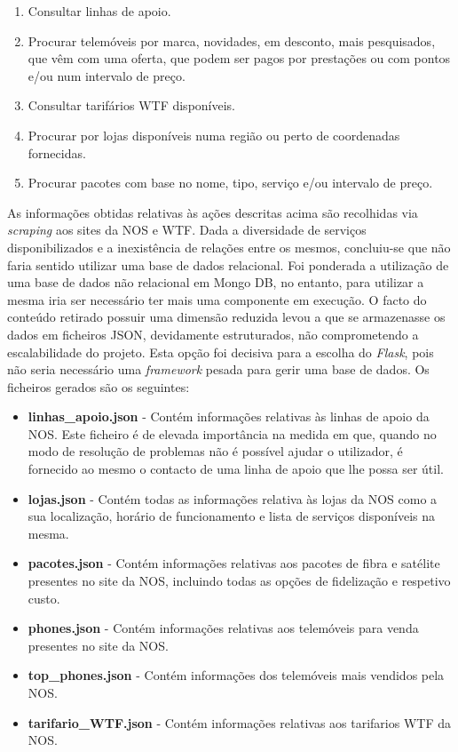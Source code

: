 \documentclass[11pt,a4paper]{article}
\begin{document}
\begin{enumerate}
    \item Consultar linhas de apoio.
    \item Procurar telemóveis por marca, novidades, em desconto, mais pesquisados, que vêm com uma oferta,
    que podem ser pagos por prestações ou com pontos e/ou num intervalo de preço.
    \item Consultar tarifários WTF disponíveis.
    \item Procurar por lojas disponíveis numa região ou perto de coordenadas fornecidas.
    \item Procurar pacotes com base no nome, tipo, serviço e/ou intervalo de preço.
\end{enumerate}

As informações obtidas relativas às ações descritas acima são recolhidas via \textit{scraping} aos sites da
NOS e WTF. Dada a diversidade de serviços disponibilizados e a inexistência de relações entre os mesmos,
concluiu-se que não faria sentido utilizar uma base de dados relacional. Foi ponderada a utilização de uma
base de dados não relacional em Mongo DB, no entanto, para utilizar a mesma iria ser necessário ter mais uma
componente em execução. O facto do conteúdo retirado possuir uma dimensão reduzida levou a que se
armazenasse os dados em ficheiros JSON, devidamente estruturados, não comprometendo a escalabilidade do
projeto. Esta opção foi decisiva para a escolha do \textit{Flask}, pois não seria necessário uma
\textit{framework} pesada para gerir uma base de dados. Os ficheiros gerados são os seguintes:

\begin{itemize}
    \item \textbf{linhas\_apoio.json} - Contém informações relativas às linhas de apoio da NOS. Este
      ficheiro é de elevada importância na medida em que, quando no modo de resolução de problemas não é possível
      ajudar o utilizador, é fornecido ao mesmo o contacto de uma linha de apoio que lhe possa ser útil.
    \item \textbf{lojas.json} - Contém todas as informações relativa às lojas da NOS como a sua localização, horário
      de funcionamento e lista de serviços disponíveis na mesma.
    \item \textbf{pacotes.json} - Contém informações relativas aos pacotes de fibra e satélite presentes no
      site da NOS, incluindo todas as opções de fidelização e respetivo custo.
    \item \textbf{phones.json} - Contém informações relativas aos telemóveis para venda presentes no site da NOS.
    \item \textbf{top\_phones.json} - Contém informações dos telemóveis mais vendidos pela NOS. 
    \item \textbf{tarifario\_WTF.json} - Contém informações relativas aos tarifarios WTF da NOS.    
\end{itemize}
\end{document}
